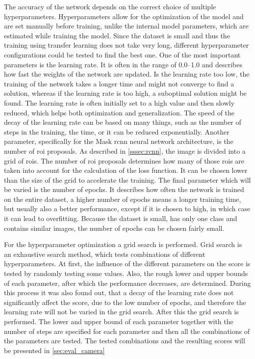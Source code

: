 The accuracy of the network depends on the correct choice of multiple hyperparameters.
Hyperparameters allow for the optimization of the model and are set manually before training, unlike the internal model parameters, which are estimated while training the model.
Since the dataset is small and thus the training using transfer learning does not take very long, different hyperparameter configurations could be tested to find the best one.
One of the most important parameters is the learning rate.
It is often in the range of \SIrange{0.0}{1.0}{} and describes how fast the weights of the network are updated.
Is the learning rate too low, the training of the network takes a longer time and might not converge to find a solution, whereas if the learning rate is too high, a suboptimal solution might be found.
The learning rate is often initially set to a high value and then slowly reduced, which helps both optimization and generalization.
The speed of the decay of the learning rate can be based on many things, such as the number of steps in the training, the time, or it can be reduced exponentially.
Another parameter, specifically for the Mask \gls{rcnn} neural network architecture, is the number of \gls{roi} proposals.
As described in \cref{sssec:rcnn}, the image is divided into a grid of \glspl{roi}.
The number of \gls{roi} proposals determines how many of those \glspl{roi} are taken into account for the calculation of the loss function.
It can be chosen lower than the size of the grid to accelerate the training.
The final parameter which will be varied is the number of epochs.
It describes how often the network is trained on the entire dataset, a higher number of epochs means a longer training time, but usually also a better performance, except if it is chosen to high, in which case it can lead to overfitting.
Because the dataset is small, has only one class and contains similar images, the number of epochs can be chosen fairly small.

For the hyperparameter optimization a grid search is performed.
Grid search is an exhaustive search method, which tests combinations of different hyperparameters.
At first, the influence of the different parameters on the score is tested by randomly testing some values.
Also, the rough lower and upper bounds of each parameter, after which the performance decreases, are determined.
During this process it was also found out, that a decay of the learning rate does not significantly affect the score, due to the low number of epochs, and therefore the learning rate will not be varied in the grid search.
After this the grid search is performed.
The lower and upper bound of each parameter together with the number of steps are specified for each parameter and then all the combinations of the parameters are tested.
The tested combinations and the resulting scores will be presented in \cref{sec:eval_camera}


